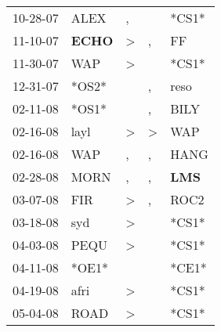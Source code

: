 \begin{supertabular}{p{0.07\textwidth}p{0.06\textwidth}p{0.02\textwidth}p{0.02\textwidth}p{0.06\textwidth}}
          10-28-07\textsuperscript{} &           ALEX\textsuperscript{} &                , &                  &                            *CS1* \\
          11-10-07\textsuperscript{} &  \textbf{ECHO\textsuperscript{}} &     \textgreater &                , &             FF\textsuperscript{} \\
          11-30-07\textsuperscript{} &            WAP\textsuperscript{} &     \textgreater &                  &                            *CS1* \\
          12-31-07\textsuperscript{} &                            *OS2* &                  &                , &           reso\textsuperscript{} \\
          02-11-08\textsuperscript{} &                            *OS1* &                  &                , &           BILY\textsuperscript{} \\
          02-16-08\textsuperscript{} &           layl\textsuperscript{} &     \textgreater &     \textgreater &            WAP\textsuperscript{} \\
          02-16-08\textsuperscript{} &            WAP\textsuperscript{} &                , &                , &           HANG\textsuperscript{} \\
          02-28-08\textsuperscript{} &           MORN\textsuperscript{} &                , &                , &   \textbf{LMS\textsuperscript{}} \\
          03-07-08\textsuperscript{} &            FIR\textsuperscript{} &     \textgreater &                , &           ROC2\textsuperscript{} \\
          03-18-08\textsuperscript{} &            syd\textsuperscript{} &     \textgreater &                  &                            *CS1* \\
          04-03-08\textsuperscript{} &           PEQU\textsuperscript{} &     \textgreater &                  &                            *CS1* \\
          04-11-08\textsuperscript{} &                            *OE1* &                  &                  &                            *CE1* \\
          04-19-08\textsuperscript{} &           afri\textsuperscript{} &     \textgreater &                  &                            *CS1* \\
          05-04-08\textsuperscript{} &           ROAD\textsuperscript{} &     \textgreater &                  &                            *CS1* \\

\end{supertabular}

